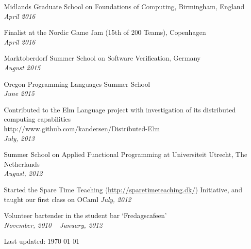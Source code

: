 \documentclass[10pt,letterpaper]{article}
\renewenvironment{itemize}{
  \begin{list}{}{
    \setlength{\leftmargin}{1.5em}
    \setlength{\itemsep}{0.25em}
    \setlength{\parskip}{0pt}
    \setlength{\parsep}{0.25em}
  }
}{
  \end{list}
}
\begin{document}
\begin{itemize}
\item Midlands Graduate School on Foundations of Computing, Birmingham, England\\
  \emph{April 2016}
\item Finalist at the Nordic Game Jam (15th of 200 Teams), Copenhagen\\
  \emph{April 2016}
\item Marktoberdorf Summer School on Software Verification, Germany\\
  \emph{August 2015}
\item Oregon Programming Languages Summer School\\
  \emph{June 2015}
\item Contributed to the Elm Language project with investigation of its distributed computing capabilities\\
   \url{http://www.github.com/kandersen/Distributed-Elm} \\
   \emph{July, 2013}
\item Summer School on Applied Functional Programming at Universiteit Utrecht, The Netherlands \\
   \emph {August, 2012} 
 \item Started the Spare Time Teaching (\url{http://sparetimeteaching.dk/}) Initiative, and taught our first class on OCaml
 \emph{July, 2012}
 \item Volunteer bartender in the student bar `Fredagscafeen' \\
    \emph{November, 2010 -- January, 2012}
\end{itemize}

\begin{center}
  \begin{small}
    Last updated: \today
  \end{small}
\end{center}
\end{document}
